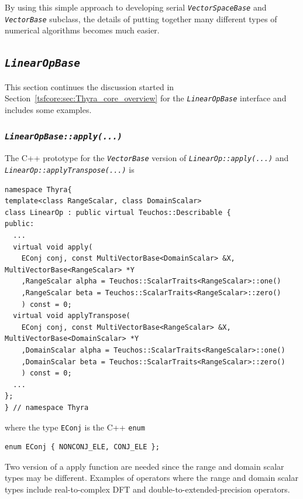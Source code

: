 \documentclass[pdf,ps2pdf,11pt]{SANDreport}
\begin{document}
By using this simple approach to developing serial
{}\texttt{\textit{Vector\-Space\-Base}} and {}\texttt{\textit{Vector\-Base}}
subclass, the details of putting together many different types of
numerical algorithms becomes much easier.

%
\subsection{\texttt{\textit{Linear\-Op\-Base}}}
\label{tsfcore:sec:linear_op}
%

This section continues the discussion started in
Section~\ref{tsfcore:sec:Thyra_core_overview} for the
{}\texttt{\textit{Linear\-Op\-Base}} interface and includes some examples.

%
\subsubsection{\texttt{\textit{LinearOpBase::apply(\-...)}}}
\label{tsfcore:sec:linear_op_apply}
%

The C++ prototype for the {}\texttt{\textit{Vector\-Base}} version of
{}\texttt{\textit{LinearOp\-::apply(\-...)}} and
{}\texttt{\textit{LinearOp\-::apply\-Transpose(\-...)}} is

{\scriptsize\begin{verbatim}
namespace Thyra{
template<class RangeScalar, class DomainScalar>
class LinearOp : public virtual Teuchos::Describable {
public:
  ...
  virtual void apply(
    EConj conj, const MultiVectorBase<DomainScalar> &X, MultiVectorBase<RangeScalar> *Y
    ,RangeScalar alpha = Teuchos::ScalarTraits<RangeScalar>::one()
    ,RangeScalar beta = Teuchos::ScalarTraits<RangeScalar>::zero()
    ) const = 0;
  virtual void applyTranspose(
    EConj conj, const MultiVectorBase<RangeScalar> &X, MultiVectorBase<DomainScalar> *Y
    ,DomainScalar alpha = Teuchos::ScalarTraits<RangeScalar>::one()
    ,DomainScalar beta = Teuchos::ScalarTraits<RangeScalar>::zero()
    ) const = 0;
  ...
};
} // namespace Thyra
\end{verbatim}}

{}\noindent{}where the type {}\texttt{EConj} is the C++ {}\texttt{enum}

{\scriptsize\begin{verbatim}
enum EConj { NONCONJ_ELE, CONJ_ELE };
\end{verbatim}}

Two version of a apply function are needed since the range and domain scalar
types may be different.  Examples of operators where the range and domain
scalar types include real-to-complex DFT and double-to-extended-precision
operators.
\end{document}
